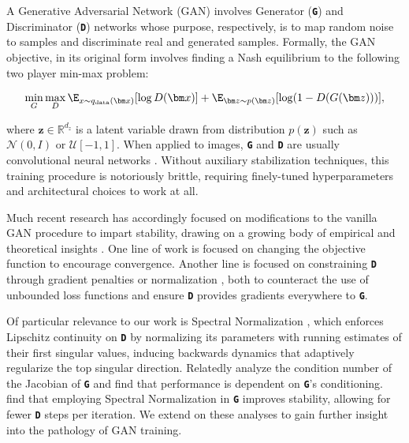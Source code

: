 \documentclass{article} %
\newcommand{\bbR}{\mathbb{R}}
\newcommand{\bmz}{{\bm z}}
\newcommand{\gen}{\textbf{\texttt{G}}}
\newcommand{\discr}{\textbf{\texttt{D}}}
\begin{document}
A Generative Adversarial Network (GAN) involves Generator (\gen{}) and Discriminator (\discr{}) networks whose purpose, respectively, is to map random noise to samples and discriminate real and generated samples. Formally, the GAN objective, in its original form \citep{goodfellow2014gans} involves finding a Nash equilibrium to the following two player min-max problem:

\begin{align}
	\min_{G} \max_{D} \E_{x\sim q_{\rm data}({\bm x})} [ \log D({\bm x})] +  \E_{{\bm z}\sim p({\bm z})} [\log(1-D(G({\bm z})))], \label{eq:advloss}
\end{align}

where $\bmz \in \bbR^{d_z}$ is a latent variable drawn from distribution $p(\bmz)$ such as $\mathcal{N}(0, I)$ or $\mathcal{U}[-1, 1]$. When applied to images, \gen{} and \discr{} are usually convolutional neural networks \citep{radford2016dcgan}. Without auxiliary stabilization techniques, this training procedure is notoriously brittle, requiring finely-tuned hyperparameters and architectural choices to work at all. 

Much recent research has accordingly focused on modifications to the vanilla GAN procedure to impart stability, drawing on a growing body of empirical and theoretical insights \citep{nowozin2016fgan, sonderby2017map, fedus2018many}. One line of work is focused on changing the objective function \citep{arjovsky2017wgan, mao2016lsgan, lim2017geometric, bellemare2017cramergan, salimans2016otgan}  to encourage convergence. Another line is focused on constraining \discr{} through gradient penalties \citep{gulrajani2017improved, kodali2014dragan, mescheder2018r1gp} or normalization \citep{miyato2018spectral}, both to counteract the use of unbounded loss functions and ensure \discr{} provides gradients everywhere to \gen{}. 

Of particular relevance to our work is Spectral Normalization \citep{miyato2018spectral}, which enforces Lipschitz continuity on \discr{} by normalizing its parameters with running estimates of their first singular values, inducing backwards dynamics that adaptively regularize the top singular direction. Relatedly \citet{odena2018causal} analyze the condition number of the Jacobian of \gen{} and find that performance is dependent on \gen{}'s conditioning. \citet{zhang2018sagan} find that employing Spectral Normalization in \gen{} improves stability, allowing for fewer \discr{} steps per iteration. We extend on these analyses to gain further insight into the pathology of GAN training.
\end{document}
